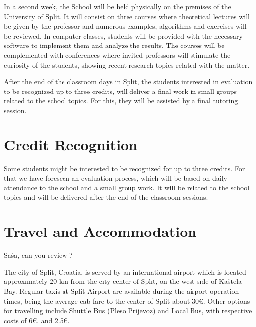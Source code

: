 \documentclass[letterpaper]{inzane_syllabus} %
\begin{document}
In a second week, the School will be held physically on the premises of the University of Split. It will consist on three courses where  theoretical lectures will be given by the professor and numerous examples, algorithms and exercises will be reviewed. In computer classes, students will be provided with the necessary software to implement them and analyze the results. The courses will be complemented with conferences where invited professors will stimulate the curiosity of the students, showing recent research topics related with the matter.

After the end of the classroom days in Split, the students interested in evaluation to be recognized up to three credits, will deliver a final work in small groups related to the school topics. For this, they will be assisted by a final tutoring session.


\newpage %

\makeSide %



\section{Credit Recognition}

Some students might be interested to be recognized for up to three credits. For that we have foreseen an evaluation process, which will be based on daily attendance to the school and  a small group work. It will be related to the school topics and will be delivered after the end of the classroom sessions.


\vspace{0.5cm}
\section{Travel and Accommodation}

{\color{myCOLOR}Sa\v sa, can you review ?}

The city of Split, Croatia, is served by an international airport which is located approximately 20 km from the city center of Split, on the west side of Kaštela Bay. Regular taxis at Split Airport are available during the airport operation times, being the average cab fare to the center of Split about 30\euro. Other options for travelling include Shuttle Bus (Pleso Prijevoz) and Local Bus, with respective costs of 6\euro. and 2.5\euro. 
\end{document}
